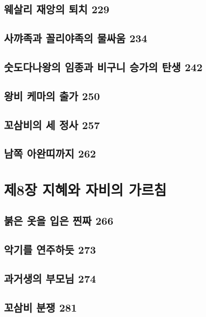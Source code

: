 \documentclass[12pt, a4paper, oneside]{book}
\let\stdsection\section
\renewcommand\section{\newpage\stdsection}
\begin{document}
	\section{웨살리 재앙의 퇴치 229 }

	\section{사꺄족과 꼴리야족의 물싸움 234 }

	\section{숫도다나왕의 임종과 비구니 승가의 탄생 242 }

	\section{왕비 케마의 출가 250 }

	\section{꼬삼비의 세 정사 257 }

	\section{남쪽 아완띠까지 262}



	\chapter{제8장 지혜와 자비의 가르침}
	\noptcrule
	\parttoc				


	\section{붉은 옷을 입은 찐짜 266 }

	\section{악기를 연주하듯 273 }

	\section{과거생의 부모님 274 }

	\section{꼬삼비 분쟁 281 }
\end{document}
